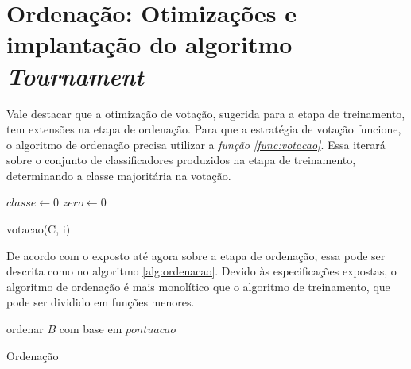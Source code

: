 \section{Ordenação: Otimizações e implantação do algoritmo \emph{Tournament}}

Vale destacar que a otimização de votação, sugerida para a etapa de treinamento, tem extensões na etapa de ordenação. Para que a estratégia de votação funcione, o algoritmo de ordenação precisa utilizar a \emph{função \ref{func:votacao}}. Essa iterará sobre o conjunto de classificadores produzidos na etapa de treinamento, determinando a classe majoritária na votação.

\begin{function}[h!]

    $classe \gets 0$\;
    $zero \gets 0$\;




    \caption{votacao(C, i)}
    \label{func:votacao}
\end{function}

De acordo com o exposto até agora sobre a etapa de ordenação, essa pode ser descrita como no algoritmo \ref{alg:ordenacao}. Devido às especificações expostas, o algoritmo de ordenação é mais monolítico que o algoritmo de treinamento, que pode ser dividido em funções menores.

\begin{algorithm}[h!]


    ordenar $B$ com base em $pontuacao$

    \caption{Ordenação}
    \label{alg:ordenacao}
\end{algorithm}

